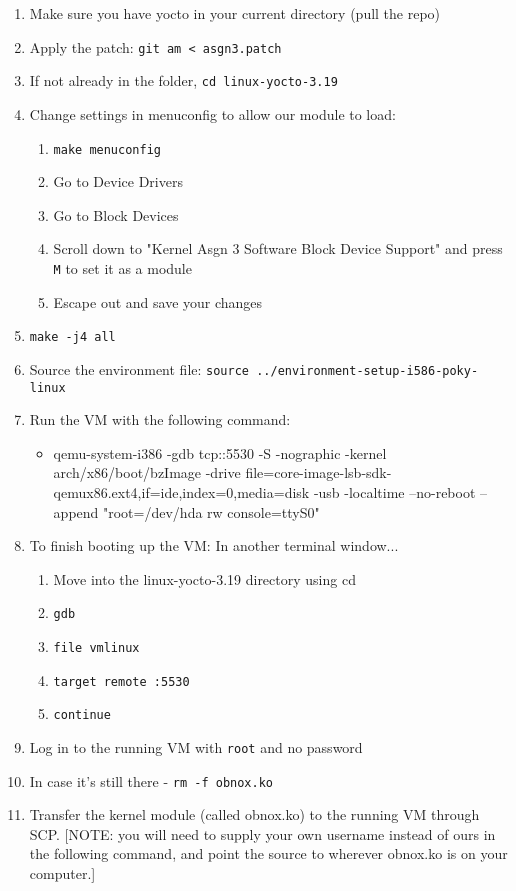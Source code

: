 \documentclass[letterpaper,10pt,titlepage]{article}
\begin{document}
\begin{enumerate}
	\item Make sure you have yocto in your current directory (pull the repo)
    \item Apply the patch: \verb|git am < asgn3.patch|
    \item If not already in the folder, \verb|cd linux-yocto-3.19|
    \item Change settings in menuconfig to allow our module to load:
    \begin{enumerate}
    	\item \verb|make menuconfig|
        \item Go to Device Drivers
        \item Go to Block Devices
        \item Scroll down to "Kernel Asgn 3 Software Block Device Support" and press \verb|M| to set it as a module
        \item Escape out and save your changes
    \end{enumerate}
    \item \verb|make -j4 all|
    \item Source the environment file: \verb|source ../environment-setup-i586-poky-linux|
    \item Run the VM with the following command: 
    \begin{itemize}
    	\item qemu-system-i386 -gdb tcp::5530 -S -nographic -kernel arch/x86/boot/bzImage -drive file=core-image-lsb-sdk-qemux86.ext4,if=ide,index=0,media=disk -usb -localtime --no-reboot --append "root=/dev/hda rw console=ttyS0"
    \end{itemize}
    \item To finish booting up the VM: In another terminal window...
    \begin{enumerate}
    	\item Move into the linux-yocto-3.19 directory using cd
        \item \verb|gdb|
        \item \verb|file vmlinux|
        \item \verb|target remote :5530|
        \item \verb|continue|
     \end{enumerate}
    \item Log in to the running VM with \verb|root| and no password
    \item In case it's still there - \verb|rm -f obnox.ko|
    \item Transfer the kernel module (called obnox.ko) to the running VM through SCP. [NOTE: you will need to supply your own username instead of ours in the following command, and point the source to wherever obnox.ko is on your computer.]

\end{enumerate}
\end{document}
